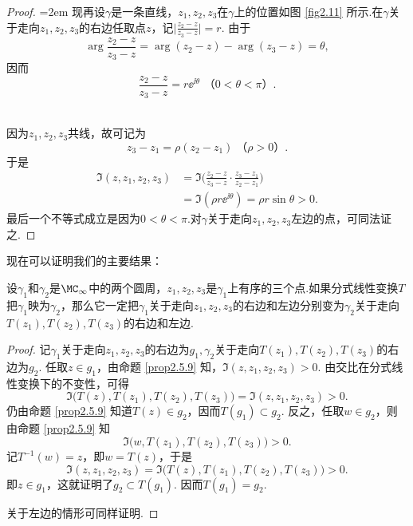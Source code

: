 \begin{proof}
\noindent\begin{minipage}[b]{0.3\textwidth}
\centering
{}
\end{minipage}
\begin{minipage}[b]{0.7\textwidth}\parindent=2em
现再设$\gamma$是一条直线，$z_1,z_2,z_3$在$\gamma$上的位置如图 \ref{fig2.11} 所示.在$\gamma$关于走向$z_1,z_2,z_3$的右边任取点$z$，记$\bigg|\frac{z_2-z}{z_3-z}\bigg|=r$. 由于
\[\arg\frac{z_2-z}{z_3-z}=\arg(z_2-z)-\arg(z_3-z)=\theta,\]
因而
\[\frac{z_2-z}{z_3-z}=r\ee^{\ii\theta}\,\,\mbox{（$0<\theta<\pi$）}.\]
\end{minipage}\\
因为$z_1,z_2,z_3$共线，故可记为
\[z_3-z_1=\rho(z_2-z_1)\;\mbox{（$\rho>0$）}.\]
于是
\begin{align*}
\Im(z,z_1,z_2,z_3)&=\Im\bigg(\frac{z_2-z}{z_3-z}\cdot\frac{z_3-z_1}{z_2-z_1}\bigg)\\
&=\Im(\rho r\ee^{\ii\theta})=\rho r\sin\theta>0.
\end{align*}
最后一个不等式成立是因为$0<\theta<\pi$.对$\gamma$关于走向$z_1,z_2,z_3$左边的点，可同法证之.
\end{proof}


现在可以证明我们的主要结果：
\begin{theorem}\label{thm2.5.10}
设$\gamma_1$和$\gamma_2$是$\MC_\infty$中的两个圆周，$z_1,z_2,z_3$是$\gamma_1$上有序的三个点.如果分式线性变换$T$把$\gamma_1$映为$\gamma_2$，那么它一定把$\gamma_1$关于走向$z_1,z_2,z_3$的右边和左边分别变为$\gamma_2$关于走向$T(z_1),T(z_2),T(z_3)$的右边和左边.
\end{theorem}
\begin{proof}
记$\gamma_1$关于走向$z_1,z_2,z_3$的右边为$g_1,\gamma_2$关于走向$T(z_1),T(z_2),T(z_3)$的右边为$g_2$. 任取$z\in g_1$，由命题 \ref{prop2.5.9} 知，$\Im(z,z_1,z_2,z_3)>0$. 由交比在分式线性变换下的不变性，可得
\[\Im\big(T(z),T(z_1),T(z_2),T(z_3)\big)=\Im(z,z_1,z_2,z_3)>0.\]
仍由命题 \ref{prop2.5.9} 知道$T(z)\in g_2$，因而$T(g_1)\subset g_2$. 反之，任取$w\in g_2$，则由命题 \ref{prop2.5.9} 知
\[\Im\big(w,T(z_1),T(z_2),T(z_3)\big)>0.\]
记$T^{-1}(w)=z$，即$w=T(z)$，于是
\[\Im(z,z_1,z_2,z_3)=\Im\big(T(z),T(z_1),T(z_2),T(z_3)\big)>0.\]
即$z\in g_1$，这就证明了$g_2\subset T(g_1)$. 因而$T(g_1)=g_2$.

关于左边的情形可同样证明.
\end{proof}

